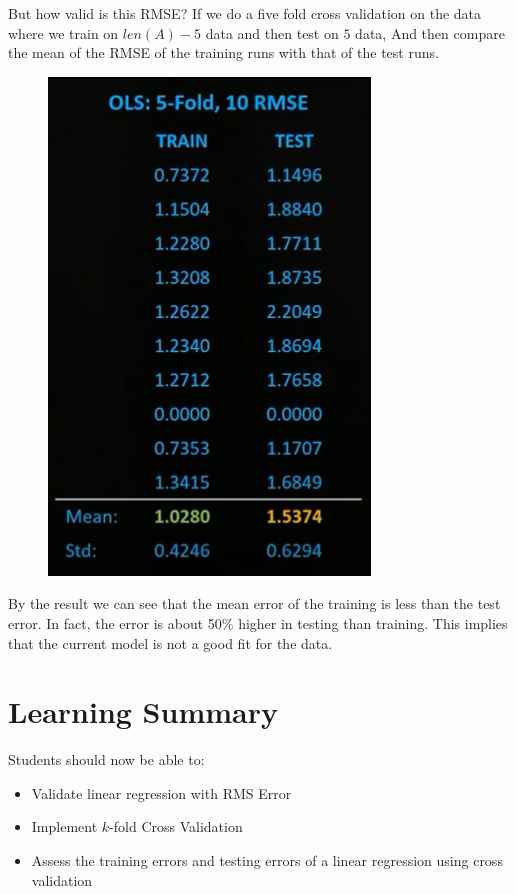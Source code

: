 \documentclass[12pt]{book}
\begin{document}
But how valid is this RMSE?\@
If we do a five fold cross validation on the data where we train on $len(A)-5$ data and then test on $5$ data,
And then compare the mean of the RMSE of the training runs with that of the test runs.
\begin{figure}[h]
        \centering
        \includegraphics[scale=0.4]{./figures/RMSvalid}
\end{figure}

By the result we can see that the mean error of the training is less than the test error.
In fact, the error is about 50\% higher in testing than training.
This implies that the current model is not a good fit for the data.

\section*{Learning Summary}
Students should now be able to:
\begin{itemize}
        \item Validate linear regression with RMS Error
        \item Implement $k$-fold Cross Validation
        \item Assess the training errors and testing errors of a linear regression using cross validation
\end{itemize}
\end{document}
